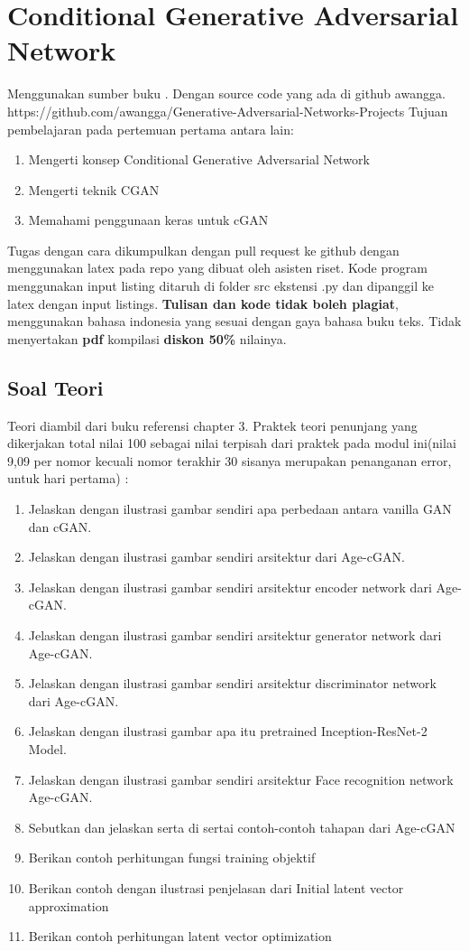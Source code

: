 \chapter{Conditional Generative Adversarial Network}
Menggunakan sumber buku \cite{ahirwar2019gan}. Dengan source code yang ada di github awangga. 
https://github.com/awangga/Generative-Adversarial-Networks-Projects
Tujuan pembelajaran pada pertemuan pertama antara lain:
\begin{enumerate}
\item
Mengerti konsep Conditional Generative Adversarial Network
\item
Mengerti teknik CGAN
\item
Memahami penggunaan keras untuk cGAN
\end{enumerate}

Tugas dengan cara dikumpulkan dengan pull request ke github dengan menggunakan latex pada repo yang dibuat oleh asisten riset. Kode program menggunakan input listing ditaruh di folder src ekstensi .py dan dipanggil ke latex dengan input listings. \textbf{Tulisan dan kode tidak boleh plagiat}, menggunakan bahasa indonesia yang sesuai dengan gaya bahasa buku teks. Tidak menyertakan \textbf{pdf} kompilasi \textbf{diskon 50\%} nilainya.


\section{Soal Teori}
Teori diambil dari buku referensi \cite{ahirwar2019gan}  chapter 3.  Praktek teori penunjang yang dikerjakan total nilai 100 sebagai nilai terpisah dari praktek pada modul ini(nilai 9,09 per nomor kecuali nomor terakhir 30 sisanya merupakan penanganan error, untuk hari pertama) :
\begin{enumerate}
\item
Jelaskan dengan ilustrasi gambar sendiri apa perbedaan antara vanilla GAN dan cGAN.
\item
Jelaskan dengan ilustrasi gambar sendiri arsitektur dari Age-cGAN.
\item
Jelaskan dengan ilustrasi gambar sendiri arsitektur encoder network dari Age-cGAN.
\item
Jelaskan dengan ilustrasi gambar sendiri arsitektur generator network dari Age-cGAN.
\item
Jelaskan dengan ilustrasi gambar sendiri arsitektur discriminator network dari Age-cGAN.
\item
Jelaskan dengan ilustrasi gambar apa itu pretrained Inception-ResNet-2 Model.
\item
Jelaskan dengan ilustrasi gambar sendiri arsitektur Face recognition network Age-cGAN.
\item
Sebutkan dan jelaskan serta di sertai contoh-contoh tahapan dari Age-cGAN
\item
Berikan contoh perhitungan fungsi training objektif
\item
Berikan contoh dengan ilustrasi penjelasan dari Initial latent vector approximation
\item
Berikan contoh perhitungan latent vector optimization
\end{enumerate}


